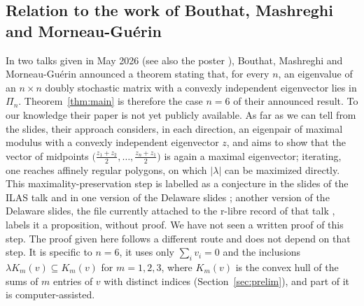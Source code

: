 \documentclass[11pt]{amsart}
\theoremstyle{definition}
\theoremstyle{remark}
\begin{document}
\subsection*{Relation to the work of Bouthat, Mashreghi and Morneau-Guérin}
In two talks given in May 2026 \cite{Bou26,BMM26} (see also the poster \cite{BMM25}), Bouthat, Mashreghi and Morneau-Guérin announced a theorem stating that, for every $n$, an eigenvalue of an $n\times n$ doubly stochastic matrix with a convexly independent eigenvector lies in $\Pi_n$. Theorem~\ref{thm:main} is therefore the case $n=6$ of their announced result. To our knowledge their paper is not yet publicly available. As far as we can tell from the slides, their approach considers, in each direction, an eigenpair of maximal modulus with a convexly independent eigenvector $z$, and aims to show that the vector of midpoints $\bigl(\frac{z_1+z_2}{2},\dots,\frac{z_n+z_1}{2}\bigr)$ is again a maximal eigenvector; iterating, one reaches affinely regular polygons, on which $\lvert\lambda\rvert$ can be maximized directly. This maximality-preservation step is labelled as a conjecture in the slides of the ILAS talk \cite{BMM26} and in one version of the Delaware slides \cite{Bou26}; another version of the Delaware slides, the file currently attached to the r-libre record of that talk \cite{Bou26b}, labels it a proposition, without proof. We have not seen a written proof of this step. The proof given here follows a different route and does not depend on that step. It is specific to $n=6$, it uses only $\sum_iv_i=0$ and the inclusions $\lambda K_m(v)\subseteq K_m(v)$ for $m=1,2,3$, where $K_m(v)$ is the convex hull of the sums of $m$ entries of $v$ with distinct indices (Section~\ref{sec:prelim}), and part of it is computer-assisted.
\end{document}
